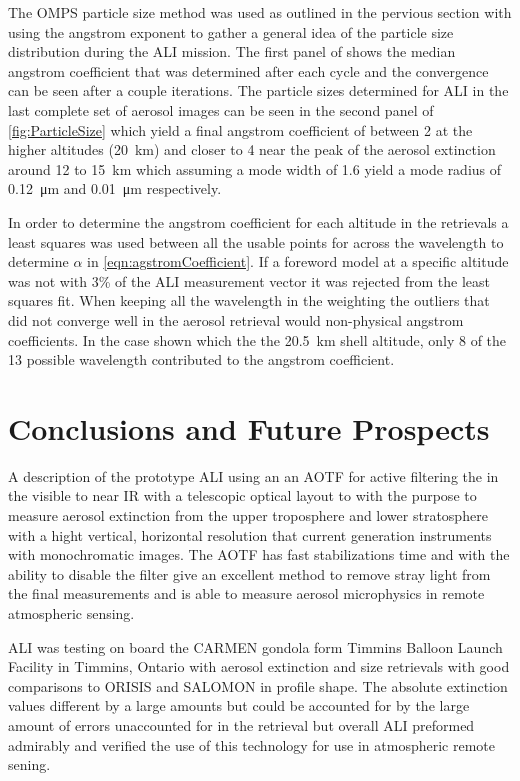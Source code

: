\documentclass[12pt]{article}
\begin{document}
The OMPS particle size method was used as outlined in the pervious section with using the angstrom exponent to gather a general idea of the particle size distribution during the ALI mission. The first panel of  shows the median angstrom coefficient that was determined after each cycle and the convergence can be seen after a couple iterations. The particle sizes determined for ALI in the last complete set of aerosol images can be seen in the second panel of \autoref{fig:ParticleSize} which yield a final angstrom coefficient of between 2 at the higher altitudes (20~km) and closer to 4 near the peak of the aerosol extinction around 12 to 15~km which assuming a mode width of 1.6 yield a mode radius of 0.12~\si{\micro\metre} and 0.01~\si{\micro\metre} respectively. 

In order to determine the angstrom coefficient for each altitude in the retrievals a least squares was used between all the usable points for across the wavelength to determine $\alpha$ in \autoref{eqn:agstromCoefficient}. If a foreword model at a specific altitude was not with 3\% of the ALI measurement vector it was rejected from the least squares fit. When keeping all the wavelength in the weighting the outliers that did not converge well in the aerosol retrieval would non-physical angstrom coefficients. In the case shown which the the 20.5~km shell altitude, only 8 of the 13 possible wavelength contributed to the angstrom coefficient.

\section{Conclusions and Future Prospects}

A description of the prototype ALI using an an AOTF for active filtering the in the visible to near IR with a telescopic optical layout to with the purpose to measure aerosol extinction from the upper troposphere and lower stratosphere with a hight vertical, horizontal resolution that current generation instruments with monochromatic images. The AOTF has fast stabilizations time and with the ability to disable the filter give an excellent method to remove stray light from the final measurements and is able to measure aerosol microphysics in remote atmospheric sensing.  

ALI was testing on board the CARMEN gondola form Timmins Balloon Launch Facility in Timmins, Ontario with aerosol extinction and size retrievals with good comparisons to ORISIS and SALOMON in profile shape. The absolute extinction values different by a large amounts but could be accounted for by the large amount of errors unaccounted for in the retrieval but overall ALI preformed admirably and verified the use of this technology for use in atmospheric remote sening. 
\end{document}
